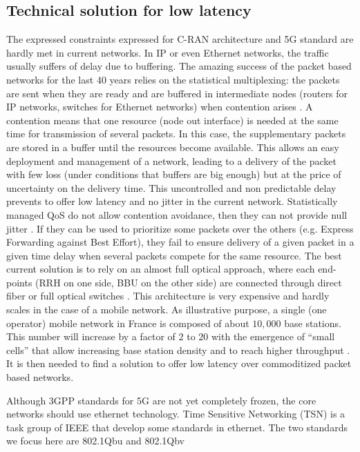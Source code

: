 \subsection{Technical solution for low latency}


The expressed constraints expressed for C-RAN architecture and 5G standard are hardly met in current networks. In IP or even Ethernet networks, the traffic usually suffers of delay due to buffering. The amazing success of the packet based networks for the last 40 years relies on the statistical multiplexing: the packets are sent when they are ready and are buffered in intermediate nodes (routers for IP networks, switches for Ethernet networks) when contention arises \cite{venkatramani1994supporting}. A contention means that one resource (node out interface) is needed at the same time for transmission of several packets. In this case, the supplementary packets are stored in a buffer until the resources become available. This allows an easy deployment and management of a network, leading to a delivery of the packet with few loss (under conditions that buffers are big enough) but at the price of uncertainty on the delivery time. This uncontrolled and non predictable delay prevents to offer low latency and no jitter in the current network. Statistically managed QoS do not allow contention avoidance, then they can not provide null jitter \cite{khaunte2003technique}. If they can be used to prioritize some packets over the others (e.g. Express Forwarding against Best Effort), they fail to ensure delivery of a given packet in a given time delay when several packets compete for the same resource. 
The best current solution is to rely on an almost full optical approach, where each end-points (RRH on one side, BBU on the other side) are connected through direct fiber or full optical switches \cite{leclerc2016transmission}\cite{leclerc2016signaling}. This architecture is very expensive and hardly scales in the case of a mobile network. As illustrative purpose, a single (one operator) mobile network in France is composed of about $10,000$ base stations. This number will increase by a factor of $2$ to $20$ with the emergence of “small cells” that allow increasing base station density and to reach higher throughput \cite{leclerc2016transmission}\cite{leclerc2016signaling}. It is then needed to find a solution to offer low latency over commoditized packet based networks. 

Although 3GPP standards for 5G are not yet completely frozen, the core networks should use ethernet technology. Time Sensitive Networking (TSN) is a task group of IEEE that develop some standards in ethernet. The two standards we focus here are 802.1Qbu and 802.1Qbv \cite{ieee802}  
  
